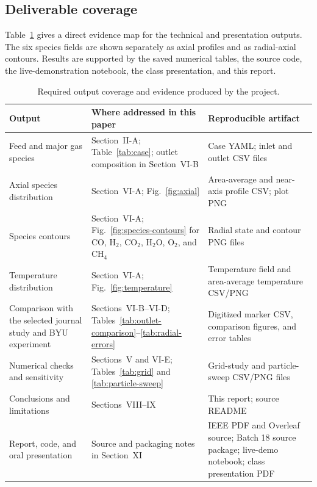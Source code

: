 \documentclass[journal]{IEEEtran}
\newcommand{\CO}{\mathrm{CO}}
\newcommand{\COtwo}{\mathrm{CO_2}}
\newcommand{\Htwo}{\mathrm{H_2}}
\newcommand{\HtwoO}{\mathrm{H_2O}}
\newcommand{\Otwo}{\mathrm{O_2}}
\newcommand{\CHfour}{\mathrm{CH_4}}
\begin{document}
\subsection{Deliverable coverage}
Table~\ref{tab:coverage} gives a direct evidence map for the technical and presentation outputs. The six species fields are shown separately as axial profiles and as radial-axial contours. Results are supported by the saved numerical tables, the source code, the live-demonstration notebook, the class presentation, and this report.
\begin{table}[t]
\caption{Required output coverage and evidence produced by the project.}
\label{tab:coverage}
\centering
\small
\begin{tabularx}{\textwidth}{>{\raggedright\arraybackslash}p{} X X}
\toprule
\textbf{Output} & \textbf{Where addressed in this paper} & \textbf{Reproducible artifact} \\
\midrule
Feed and major gas species & Section~II-A; Table~\ref{tab:case}; outlet composition in Section~VI-B & Case YAML; inlet and outlet CSV files \\
Axial species distribution & Section~VI-A; Fig.~\ref{fig:axial} & Area-average and near-axis profile CSV; plot PNG \\
Species contours & Section~VI-A; Fig.~\ref{fig:species-contours} for \(\CO\), \(\Htwo\), \(\COtwo\), \(\HtwoO\), \(\Otwo\), and \(\CHfour\) & Radial state and contour PNG files \\
Temperature distribution & Section~VI-A; Fig.~\ref{fig:temperature} & Temperature field and area-average temperature CSV/PNG \\
Comparison with the selected journal study and BYU experiment & Sections~VI-B--VI-D; Tables~\ref{tab:outlet-comparison}--\ref{tab:radial-errors} & Digitized marker CSV, comparison figures, and error tables \\
Numerical checks and sensitivity & Sections~V and VI-E; Tables~\ref{tab:grid} and \ref{tab:particle-sweep} & Grid-study and particle-sweep CSV/PNG files \\
Conclusions and limitations & Sections~VIII--IX & This report; source README \\
Report, code, and oral presentation & Source and packaging notes in Section~XI & IEEE PDF and Overleaf source; Batch 18 source package; live-demo notebook; class presentation PDF \\
\bottomrule
\end{tabularx}
\end{table}
\end{document}
